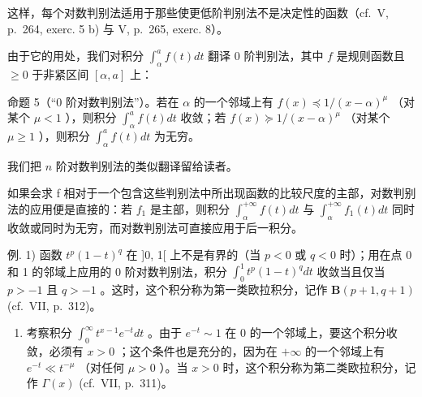 这样，每个对数判别法适用于那些使更低阶判别法不是决定性的函数（cf.~V, p.~264, exerc. 5 b) 与 V, p.~265, exerc. 8）。

由于它的用处，我们对积分 \(\int_{\alpha}^{a}f(t)dt\) 翻译 0 阶判别法，其中 \(f\) 是规则函数且 \(\geqslant 0\) 于非紧区间 \([\alpha ,a]\) 上：

命题 5（``0 阶对数判别法''）。若在 \(\alpha\) 的一个邻域上有 \(f(x) \preccurlyeq 1/(x - \alpha)^{\mu}\) （对某个 \(\mu < 1\) ），则积分 \(\int_{\alpha}^{a} f(t) dt\) 收敛；若 \(f(x) \succcurlyeq 1/(x - \alpha)^{\mu}\) （对某个 \(\mu \geqslant 1\) ），则积分 \(\int_{\alpha}^{a} f(t) dt\) 为无穷。

我们把 \(n\) 阶对数判别法的类似翻译留给读者。

如果会求 f 相对于一个包含这些判别法中所出现函数的比较尺度的主部，对数判别法的应用便是直接的：若 \(f_{1}\) 是主部，则积分 \(\int_{\alpha}^{+\infty} f(t) dt\) 与 \(\int_{\alpha}^{+\infty} f_{1}(t) dt\) 同时收敛或同时为无穷，而对数判别法可直接应用于后一积分。

例. 1) 函数 \(t^p (1 - t)^q\) 在 {]}0, 1{[} 上不是有界的（当 \(p < 0\) 或 \(q < 0\) 时）；用在点 0 和 1 的邻域上应用的 0 阶对数判别法，积分 \(\int_0^1 t^p (1 - t)^q dt\) 收敛当且仅当 \(p > -1\) 且 \(q > -1\) 。这时，这个积分称为第一类欧拉积分，记作 \(\mathbf{B}(p + 1,q + 1)\) (cf.~VII, p.~312)。

\begin{enumerate}
\def\labelenumi{\arabic{enumi})}
\setcounter{enumi}{1}
\tightlist
\item
  考察积分 \(\int_0^\infty t^{x - 1}e^{-t}dt\) 。由于 \(e^{-t}\sim 1\) 在 0 的一个邻域上，要这个积分收敛，必须有 \(x > 0\) ；这个条件也是充分的，因为在 \(+\infty\) 的一个邻域上有 \(e^{-t}\ll t^{-\mu}\) （对任何 \(\mu >0\) ）。当 \(x > 0\) 时，这个积分称为第二类欧拉积分，记作 \(\Gamma (x)\) (cf.~VII, p.~311)。
\end{enumerate}

